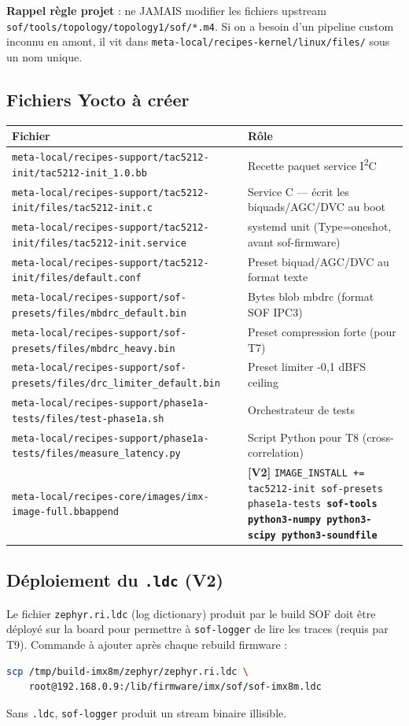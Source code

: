 \documentclass[11pt,a4paper]{article}
\begin{document}
\textbf{Rappel règle projet} : ne JAMAIS modifier les fichiers upstream \texttt{sof/tools/topology/topology1/sof/*.m4}. Si on a besoin d'un pipeline custom inconnu en amont, il vit dans \texttt{meta-local/recipes-kernel/linux/files/} sous un nom unique.

\subsection{Fichiers Yocto à créer}

\begin{center}
\begin{tabularx}{\textwidth}{lX}
\toprule
\textbf{Fichier} & \textbf{Rôle} \\
\midrule
\texttt{meta-local/recipes-support/tac5212-init/tac5212-init\_1.0.bb} & Recette paquet service I\textsuperscript{2}C \\
\texttt{meta-local/recipes-support/tac5212-init/files/tac5212-init.c} & Service C --- écrit les biquads/AGC/DVC au boot \\
\texttt{meta-local/recipes-support/tac5212-init/files/tac5212-init.service} & systemd unit (Type=oneshot, avant sof-firmware) \\
\texttt{meta-local/recipes-support/tac5212-init/files/default.conf} & Preset biquad/AGC/DVC au format texte \\
\texttt{meta-local/recipes-support/sof-presets/files/mbdrc\_default.bin} & Bytes blob mbdrc (format SOF IPC3) \\
\texttt{meta-local/recipes-support/sof-presets/files/mbdrc\_heavy.bin} & Preset compression forte (pour T7) \\
\texttt{meta-local/recipes-support/sof-presets/files/drc\_limiter\_default.bin} & Preset limiter -0{,}1 dBFS ceiling \\
\texttt{meta-local/recipes-support/phase1a-tests/files/test-phase1a.sh} & Orchestrateur de tests \\
\texttt{meta-local/recipes-support/phase1a-tests/files/measure\_latency.py} & Script Python pour T8 (cross-correlation) \\
\texttt{meta-local/recipes-core/images/imx-image-full.bbappend} & \textbf{[V2]} \texttt{IMAGE\_INSTALL += tac5212-init sof-presets phase1a-tests \textbf{sof-tools python3-numpy python3-scipy python3-soundfile}} \\
\bottomrule
\end{tabularx}
\end{center}

\subsection{Déploiement du \texttt{.ldc} (V2)}
Le fichier \texttt{zephyr.ri.ldc} (log dictionary) produit par le build SOF doit être déployé sur la board pour permettre à \texttt{sof-logger} de lire les traces (requis par T9). Commande à ajouter après chaque rebuild firmware :
\begin{lstlisting}[language=bash]
scp /tmp/build-imx8m/zephyr/zephyr.ri.ldc \
    root@192.168.0.9:/lib/firmware/imx/sof/sof-imx8m.ldc
\end{lstlisting}
Sans \texttt{.ldc}, \texttt{sof-logger} produit un stream binaire illisible.
\end{document}
